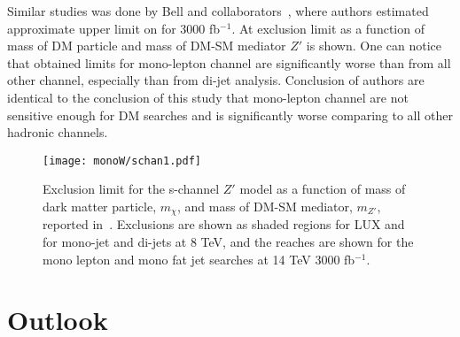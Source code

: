 Similar studies was done by Bell and collaborators~\cite{arXiv:1512.00476}, where authors estimated approximate upper limit on for 3000 fb$^{-1}$. 
At  exclusion limit
as a function of mass of DM particle and mass of DM-SM mediator $Z'$ is shown. One can notice that obtained limits for mono-lepton channel are significantly 
worse than from all other channel, especially than from di-jet analysis. Conclusion of authors are identical to the conclusion of this study that mono-lepton channel
are not sensitive enough for DM searches and is significantly worse comparing to all other hadronic channels.

\begin{figure}[]
 \texttt{[image: monoW/schan1.pdf]}
  \caption{Exclusion limit for the s-channel $Z'$ model as a function of mass of dark matter particle, $m_{\chi}$, 
  and mass of DM-SM mediator, $m_{Z'}$, reported in~\cite{arXiv:1512.00476}.
  Exclusions are shown as shaded regions for LUX and for mono-jet and di-jets at 8 TeV, 
  and the reaches are shown for the mono lepton and mono fat jet searches at 14 TeV 3000 fb$^{-1}$.}
  \label{fig:bellExclLim}
\end{figure}

\section{Outlook}
\label{sec:wprimeConclusion}
